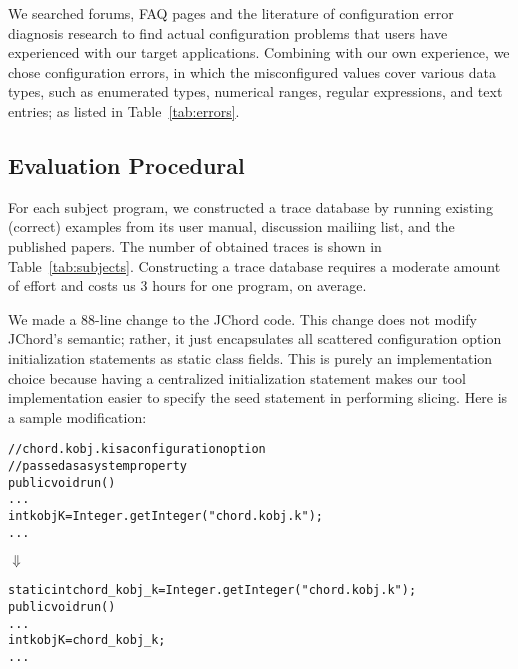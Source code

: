 We searched forums, FAQ pages and the literature of
configuration error diagnosis research to find actual
configuration problems that users have experienced with our
target applications. Combining with our own experience,
we chose \errors configuration errors, in which
the misconfigured values cover various data types, such as enumerated types,
numerical ranges, regular expressions, and text entries;
as listed in Table~\ref{tab:errors}.

\subsection{Evaluation Procedural}

For each subject program, we constructed a trace database
by running existing (correct) examples from its user manual, discussion
mailiing list, and the published papers. The number of obtained
 traces is shown in Table~\ref{tab:subjects}. 
Constructing a trace database requires a moderate amount of
effort and costs us 3 hours for one program, on average.


We made a 88-line change to the JChord code. This change
does not modify JChord's semantic; rather, it just encapsulates
all scattered configuration option initialization statements 
as static class fields. This is purely an implementation
choice because having a centralized initialization statement
makes our tool implementation easier to specify the seed statement
in performing slicing. Here is a sample modification:



\begin{CodeOut}
\begin{alltt}
   // chord.kobj.k is a configuration option
   // passed as a system property
   public void run() \ttlcb
     ...
     int kobjK = Integer.getInteger("chord.kobj.k");
     ...
   \ttrcb
\end{alltt}
\end{CodeOut}
\vspace{-4mm}
\hspace{20mm}$\Downarrow$ 
\begin{CodeOut}
\begin{alltt}
   static int chord\_kobj\_k = Integer.getInteger("chord.kobj.k");
   public void run() \ttlcb
     ...
     int kobjK = chord\_kobj\_k; 
     ...
   \ttrcb
\end{alltt}
\end{CodeOut}



